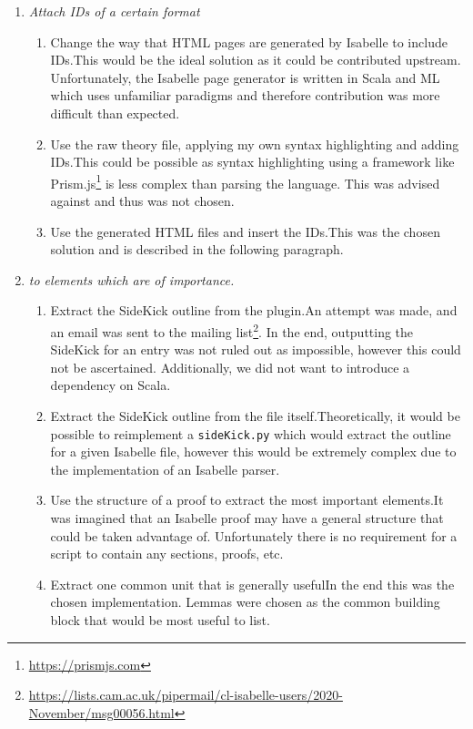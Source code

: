 \documentclass[bsc,frontabs,oneside,singlespacing,parskip,deptreport,logo]{infthesis}
\begin{document}
\begin{enumerate}
    \item \emph{Attach IDs of a certain format}
    \begin{enumerate}
        \item Change the way that HTML pages are generated by Isabelle to include IDs.\quad This would be the ideal solution as it could be contributed upstream. Unfortunately, the Isabelle page generator is written in Scala and ML which uses unfamiliar paradigms and therefore contribution was more difficult than expected.
        \item Use the raw theory file, applying my own syntax highlighting and adding IDs.\quad This could be possible as syntax highlighting using a framework like Prism.js\footnote{\url{https://prismjs.com}} is less complex than parsing the language. This was advised against and thus was not chosen.
        \item Use the generated HTML files and insert the IDs.\quad This was the chosen solution and is described in the following paragraph.
    \end{enumerate}
    \item \emph{to elements which are of importance.}
    \begin{enumerate}
        \item Extract the SideKick outline from the plugin.\quad An attempt was made, and an email was sent to the mailing list\footnote{\url{https://lists.cam.ac.uk/pipermail/cl-isabelle-users/2020-November/msg00056.html}}. In the end, outputting the SideKick for an entry was not ruled out as impossible, however this could not be ascertained. Additionally, we did not want to introduce a dependency on Scala.
        \item Extract the SideKick outline from the file itself.\quad Theoretically, it would be possible to reimplement a \texttt{sideKick.py} which would extract the outline for a given Isabelle file, however this would be extremely complex due to the implementation of an Isabelle parser.
        \item Use the structure of a proof to extract the most important elements.\quad It was imagined that an Isabelle proof may have a general structure that could be taken advantage of. Unfortunately there is no requirement for a script to contain any sections, proofs, etc.
        \item Extract one common unit that is generally useful\quad In the end this was the chosen implementation. Lemmas were chosen as the common building block that would be most useful to list. 
    \end{enumerate}
\end{enumerate}
\end{document}
